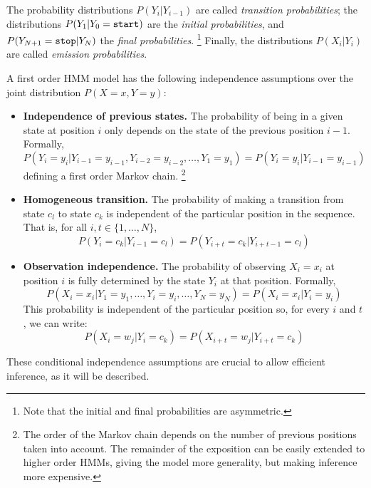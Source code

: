 The probability distributions $P(Y_{i}|Y_{i-1})$ are called \emph{transition probabilities}; the distributions 
$P(Y_{1}|Y_{0} = {\tt start})$ are the \emph{initial probabilities}, and 
$P(Y_{N+1}={\tt stop} |Y_{N})$ the \emph{final probabilities}.%
\footnote{Note that the initial and final probabilities 
are asymmetric.} %
Finally, the distributions $P(X_i|Y_i)$ are called \emph{emission probabilities}. 


A first order HMM model has the following independence assumptions over the joint distribution $P(X=x,Y=y)$:
\begin{itemize}
  \item \textbf{Independence of previous states.} The probability of
    being in a given state at position $i$ only depends on
    the state of the previous position $i-1$. Formally, 
    \begin{equation*}
    P (Y_i = y_i | Y_{i-1} = y_{i-1}, Y_{i-2} = y_{i-2}, \ldots, Y_1 = y_1) = P (Y_i = y_i | Y_{i-1} = y_{i-1})
    \end{equation*} 
    defining a first order Markov chain.%
    \footnote{The order of the Markov chain depends on the number of previous positions taken into account. 
    The remainder of the exposition can be easily extended to higher order HMMs, giving the model more generality, 
    but making inference more expensive.}
  \item \textbf{Homogeneous transition.} The probability of
    making a transition from state $c_l$ to state $c_k$ is independent of
    the particular position in the sequence. That is, for all $i,t \in \{1,\ldots,N\}$,
     \begin{equation*}
    P (Y_i = c_k | Y_{i-1} = c_l) =  P (Y_{i+t} = c_k | Y_{i+t-1} = c_l)
     \end{equation*}
  \item \textbf{Observation independence.}  The probability of
    observing $X_i = x_i$ at position $i$ is fully determined by the state $Y_i$
    at that position. Formally, 
     \begin{equation*}
     P (X_i = x_i | Y_1=y_1, \ldots, Y_i=y_i, \ldots, Y_N=y_N) = P(X_i = x_i | Y_i = y_i)
      \end{equation*}
      This probability is independent of the
    particular position so, for every $i$ and $t$, we can write:  
     \begin{equation*}
    P(X_i = w_j | Y_i = c_k) = P(X_{i+t} = w_j | Y_{i+t} = c_k)
     \end{equation*}
\end{itemize}
These conditional independence assumptions are crucial to allow
efficient inference, as it will be described.

